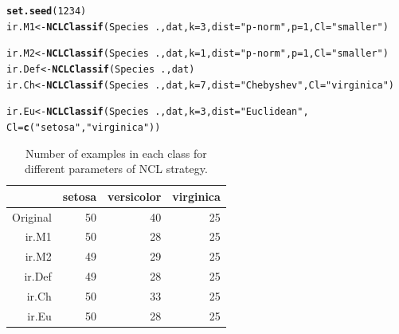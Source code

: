 \documentclass[10pt,a4paper]{article}\usepackage[]{graphicx}\usepackage[]{color}
\makeatletter
\newcommand{\hlnum}[1]{\textcolor[rgb]{0.686,0.059,0.569}{#1}}%
\newcommand{\hlstr}[1]{\textcolor[rgb]{0.192,0.494,0.8}{#1}}%
\newcommand{\hlopt}[1]{\textcolor[rgb]{0,0,0}{#1}}%
\newcommand{\hlstd}[1]{\textcolor[rgb]{0.345,0.345,0.345}{#1}}%
\newcommand{\hlkwb}[1]{\textcolor[rgb]{0.69,0.353,0.396}{#1}}%
\newcommand{\hlkwc}[1]{\textcolor[rgb]{0.333,0.667,0.333}{#1}}%
\newcommand{\hlkwd}[1]{\textcolor[rgb]{0.737,0.353,0.396}{\textbf{#1}}}%
\newenvironment{kframe}{%
 \def\at@end@of@kframe{}%
 \ifinner\ifhmode%
  \def\at@end@of@kframe{\end{minipage}}%
  \begin{minipage}{\columnwidth}%
 \fi\fi%
 \def\FrameCommand##1{\hskip\@totalleftmargin \hskip-\fboxsep
 \colorbox{shadecolor}{##1}\hskip-\fboxsep
     \hskip-\linewidth \hskip-\@totalleftmargin \hskip\columnwidth}%
 \MakeFramed {\advance\hsize-\width
   \@totalleftmargin\z@ \linewidth\hsize
   \@setminipage}}%
 {\par\unskip\endMakeFramed%
 \at@end@of@kframe}
\newenvironment{knitrout}{}{} %
\makeatother
\begin{document}
\begin{knitrout}\footnotesize
{}\color{fgcolor}\begin{kframe}
\begin{alltt}
\hlkwd{set.seed}\hlstd{(}\hlnum{1234}\hlstd{)}
\hlstd{ir.M1} \hlkwb{<-} \hlkwd{NCLClassif}\hlstd{(Species}\hlopt{~}\hlstd{., dat,} \hlkwc{k}\hlstd{=}\hlnum{3}\hlstd{,} \hlkwc{dist}\hlstd{=}\hlstr{"p-norm"}\hlstd{,} \hlkwc{p}\hlstd{=}\hlnum{1}\hlstd{,} \hlkwc{Cl}\hlstd{=}\hlstr{"smaller"}\hlstd{)}
\end{alltt}


{\ttfamily\noindent\color{warningcolor}{\#\# Warning in ENNClassif(form, dat[which(dat[, tgt] \%in\% otherCl), ], k, dist, : There are no examples to remove!}}\begin{alltt}
\hlstd{ir.M2}\hlkwb{<-} \hlkwd{NCLClassif}\hlstd{(Species}\hlopt{~}\hlstd{., dat,} \hlkwc{k}\hlstd{=}\hlnum{1}\hlstd{,} \hlkwc{dist}\hlstd{=}\hlstr{"p-norm"}\hlstd{,} \hlkwc{p}\hlstd{=}\hlnum{1}\hlstd{,} \hlkwc{Cl}\hlstd{=}\hlstr{"smaller"}\hlstd{)}
\hlstd{ir.Def} \hlkwb{<-} \hlkwd{NCLClassif}\hlstd{(Species}\hlopt{~}\hlstd{., dat)}
\hlstd{ir.Ch} \hlkwb{<-} \hlkwd{NCLClassif}\hlstd{(Species}\hlopt{~}\hlstd{., dat,} \hlkwc{k}\hlstd{=}\hlnum{7}\hlstd{,} \hlkwc{dist}\hlstd{=}\hlstr{"Chebyshev"}\hlstd{,} \hlkwc{Cl}\hlstd{=}\hlstr{"virginica"}\hlstd{)}
\end{alltt}


{\ttfamily\noindent\color{warningcolor}{\#\# Warning in ENNClassif(form, dat[which(dat[, tgt] \%in\% otherCl), ], k, dist, : There are no examples to remove!}}\begin{alltt}
\hlstd{ir.Eu} \hlkwb{<-} \hlkwd{NCLClassif}\hlstd{(Species}\hlopt{~}\hlstd{., dat,} \hlkwc{k}\hlstd{=}\hlnum{3}\hlstd{,} \hlkwc{dist}\hlstd{=}\hlstr{"Euclidean"}\hlstd{,}
                    \hlkwc{Cl}\hlstd{=}\hlkwd{c}\hlstd{(}\hlstr{"setosa"}\hlstd{,} \hlstr{"virginica"}\hlstd{))}
\end{alltt}
\end{kframe}
\end{knitrout}


\begin{table}[ht]
\centering
\begin{tabular}{rrrr}
  \hline
 & setosa & versicolor & virginica \\ 
  \hline
Original &  50 &  40 &  25 \\ 
  ir.M1 &  50 &  28 &  25 \\ 
  ir.M2 &  49 &  29 &  25 \\ 
  ir.Def &  49 &  28 &  25 \\ 
  ir.Ch &  50 &  33 &  25 \\ 
  ir.Eu &  50 &  28 &  25 \\ 
   \hline
\end{tabular}
\caption{Number of examples in each class for different parameters of NCL strategy.} 
\label{tab:iris_NCL_table}
\end{table}
\end{document}
